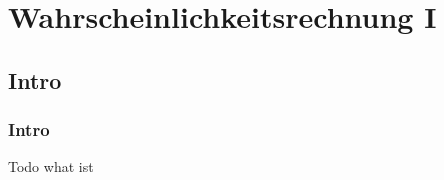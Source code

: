 
\section{Wahrscheinlichkeitsrechnung I}
\subsection*{Intro}
\begin{frame}
  \frametitle{Intro}
  Todo
  what ist

\end{frame}

